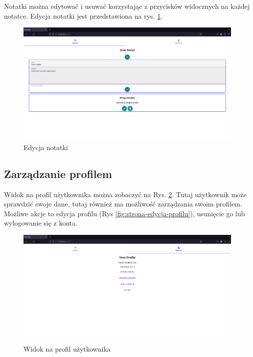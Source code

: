 \documentclass[a4paper,twoside,12pt]{book}
\begin{document}
Notatki można edytować i usuwać korzystając z przycisków widocznych na każdej notatce.
Edycja notatki jest przedstawiona na rys. \ref{fig:edycja-notatki}.

\begin{figure}[H]
\centering
\includegraphics[width=1.0\textwidth]{./images/edycja-notatki.png}
\caption{Edycja notatki}
\label{fig:edycja-notatki}
\end{figure}

\subsection{Zarządzanie profilem}
Widok na profil użytkownika można zobaczyć na Rys. \ref{fig:strona-profilu}. 
Tutaj użytkownik może sprawdzić swoje dane, tutaj również ma możliwość
zarządzania swoim profilem. Możliwe akcje to edycja profilu (Rys \ref{fig:strona-edycja-profilu}), usunięcie go
lub wylogowanie się z konta.

\begin{figure}[H]
\centering
\includegraphics[width=1.0\textwidth]{./images/strona-profilu.png}
\caption{Widok na profil użytkownika}
\label{fig:strona-profilu}
\end{figure}
\end{document}
